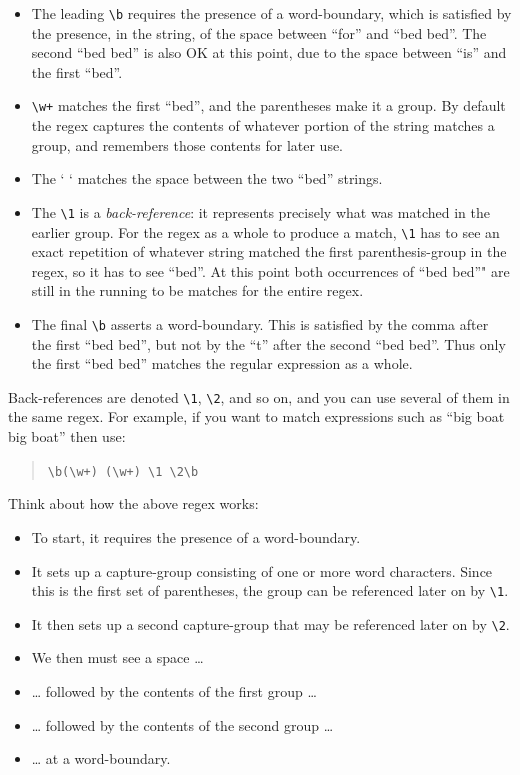 \documentclass[]{book}
\providecommand{\tightlist}{%
  \setlength{\itemsep}{0pt}\setlength{\parskip}{0pt}}
\theoremstyle{definition}
\theoremstyle{definition}
\theoremstyle{definition}
\theoremstyle{remark}
\begin{document}
{\begin{itemize}
\tightlist
\item
  The leading \texttt{\textbackslash{}b} requires the presence of a
  word-boundary, which is satisfied by the presence, in the string, of
  the space between ``for'' and ``bed bed''. The second ``bed bed'' is
  also OK at this point, due to the space between ``is'' and the first
  ``bed''.
\item
  \texttt{\textbackslash{}w+} matches the first ``bed'', and the
  parentheses make it a group. By default the regex captures the
  contents of whatever portion of the string matches a group, and
  remembers those contents for later use.
\item
  The ` ` matches the space between the two ``bed'' strings.
\item
  The \texttt{\textbackslash{}1} is a \emph{back-reference}:
  it represents precisely what was matched in the
  earlier group. For the regex as a whole to produce a match,
  \texttt{\textbackslash{}1} has to see an exact repetition of whatever
  string matched the first parenthesis-group in the regex, so it has to
  see ``bed''. At this point both occurrences of ``bed bed''" are still
  in the running to be matches for the entire regex.
\item
  The final \texttt{\textbackslash{}b} asserts a word-boundary. This is
  satisfied by the comma after the first ``bed bed'', but not by the
  ``t'' after the second ``bed bed''. Thus only the first ``bed bed''
  matches the regular expression as a whole.
\end{itemize}

Back-references are denoted \texttt{\textbackslash{}1},
\texttt{\textbackslash{}2}, and so on, and you can use several of them
in the same regex. For example, if you want to match expressions such as
``big boat big boat'' then use:

\begin{quote}
\texttt{\textbackslash{}b(\textbackslash{}w+)\ (\textbackslash{}w+)\ \textbackslash{}1\ \textbackslash{}2\textbackslash{}b}
\end{quote}

Think about how the above regex works:

\begin{itemize}
\tightlist
\item
  To start, it requires the presence of a word-boundary.
\item
  It sets up a capture-group consisting of one or more word characters.
  Since this is the first set of parentheses, the group can be
  referenced later on by \texttt{\textbackslash{}1}.
\item
  It then sets up a second capture-group that may be referenced later on
  by \texttt{\textbackslash{}2}.
\item
  We then must see a space \ldots{}
\item
  \ldots{} followed by the contents of the first group \ldots{}
\item
  \ldots{} followed by the contents of the second group \ldots{}
\item
  \ldots{} at a word-boundary.
\end{itemize}

}
\end{document}
